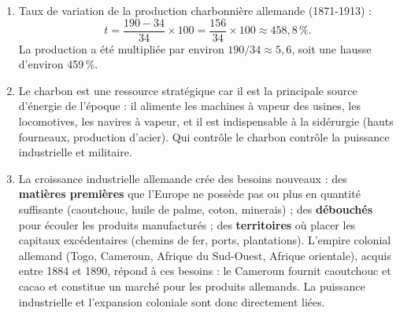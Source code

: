 \documentclass[11pt]{article}
\begin{document}
\begin{corrige}
\begin{enumerate}
\item Taux de variation de la production charbonnière allemande (1871-1913) :
\[ t = \frac{190 - 34}{34} \times 100 = \frac{156}{34} \times 100 \approx 458,8\,\%. \]
La production a été multipliée par environ $190 / 34 \approx 5,6$, soit une hausse d'environ 459\,\%.
\item Le charbon est une ressource stratégique car il est la principale source d'énergie de l'époque : il alimente les machines à vapeur des usines, les locomotives, les navires à vapeur, et il est indispensable à la sidérurgie (hauts fourneaux, production d'acier). Qui contrôle le charbon contrôle la puissance industrielle et militaire.
\item La croissance industrielle allemande crée des besoins nouveaux : des \textbf{matières premières} que l'Europe ne possède pas ou plus en quantité suffisante (caoutchouc, huile de palme, coton, minerais) ; des \textbf{débouchés} pour écouler les produits manufacturés ; des \textbf{territoires} où placer les capitaux excédentaires (chemins de fer, ports, plantations). L'empire colonial allemand (Togo, Cameroun, Afrique du Sud-Ouest, Afrique orientale), acquis entre 1884 et 1890, répond à ces besoins : le Cameroun fournit caoutchouc et cacao et constitue un marché pour les produits allemands. La puissance industrielle et l'expansion coloniale sont donc directement liées.
\end{enumerate}
\end{corrige}
\end{document}
